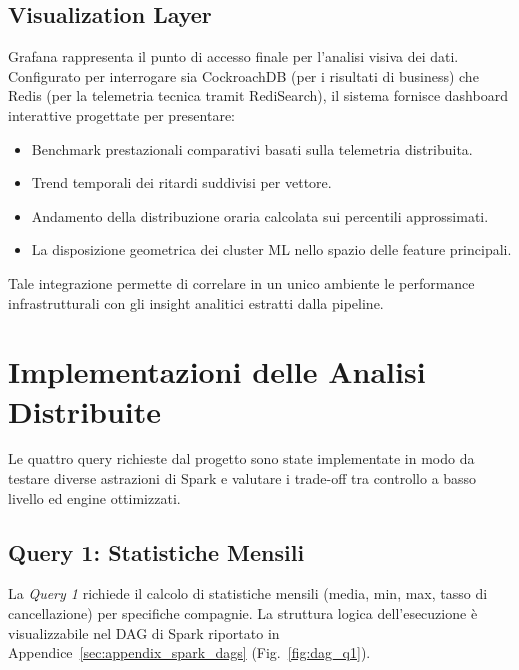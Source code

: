 \documentclass[conference]{IEEEtran}
\begin{document}
\subsection{Visualization Layer}\label{subsec:visualization_layer}
Grafana rappresenta il punto di accesso finale per l'analisi visiva dei dati. 
Configurato per interrogare sia CockroachDB (per i risultati di business) che Redis (per la telemetria tecnica tramit RediSearch), il sistema fornisce dashboard interattive progettate per presentare:
\begin{itemize}
    \item Benchmark prestazionali comparativi basati sulla telemetria distribuita.
    \item Trend temporali dei ritardi suddivisi per vettore.
    \item Andamento della distribuzione oraria calcolata sui percentili approssimati.
    \item La disposizione geometrica dei cluster ML nello spazio delle feature principali.
\end{itemize}
Tale integrazione permette di correlare in un unico ambiente le performance infrastrutturali con gli insight analitici estratti dalla pipeline.


\section{Implementazioni delle Analisi Distribuite}\label{sec:implementation_details}
Le quattro query richieste dal progetto sono state implementate in modo da testare diverse astrazioni di Spark e valutare i trade-off tra controllo a basso livello ed engine ottimizzati.

\subsection{Query 1: Statistiche Mensili}
La \textit{Query 1} richiede il calcolo di statistiche mensili (media, min, max, tasso di cancellazione) per specifiche compagnie. La struttura logica dell'esecuzione è visualizzabile nel DAG di Spark riportato in Appendice~\ref{sec:appendix_spark_dags} (Fig.~\ref{fig:dag_q1}).
\end{document}
